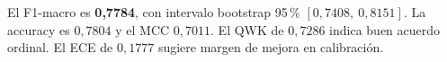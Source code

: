 El F1-macro es \textbf{0{,}7784}, con intervalo bootstrap 95\,\% $[0{,}7408,\ 0{,}8151]$. La accuracy es $0{,}7804$ y el MCC $0{,}7011$. El QWK de $0{,}7286$ indica buen acuerdo ordinal. El ECE de $0{,}1777$ sugiere margen de mejora en calibración.
